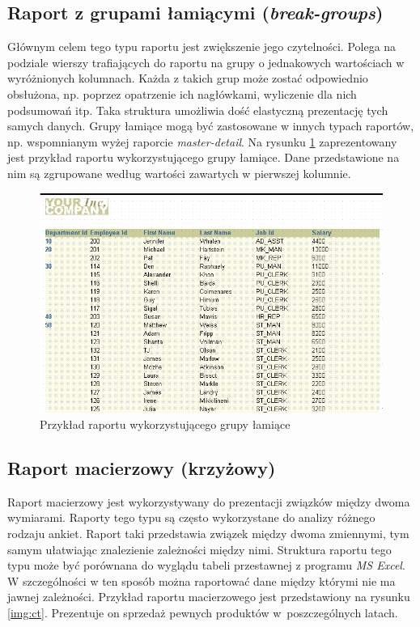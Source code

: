 \documentclass[11pt,a4paper]{article}
\begin{document}
\subsection{Raport z grupami łamiącymi (\emph{break-groups})} \label{teoria:bg}
Głównym celem tego typu raportu jest zwiększenie jego czytelności. Polega na podziale wierszy trafiających do raportu na grupy o jednakowych wartościach w wyróżnionych kolumnach. Każda z takich grup może zostać odpowiednio obsłużona, np. poprzez opatrzenie ich nagłówkami, wyliczenie dla nich podsumowań itp. Taka struktura umożliwia dość elastyczną prezentację tych samych danych. Grupy łamiące mogą być zastosowane w innych typach raportów, np. wspomnianym wyżej raporcie \emph{master-detail}. Na rysunku \ref{img:bg} zaprezentowany jest przykład raportu wykorzystującego grupy łamiące. Dane przedstawione na nim są zgrupowane według wartości zawartych w pierwszej kolumnie.
\begin{figure}[h]
\centering
\includegraphics[scale=0.7]{grp1col_lft1_out1}
\caption{Przykład raportu wykorzystującego grupy łamiące}
\label{img:bg}
\end{figure}

\subsection{Raport macierzowy (krzyżowy) } \label{teoria:ct}
Raport macierzowy jest wykorzystywany do prezentacji związków między dwoma wymiarami. Raporty tego typu są często wykorzystane do analizy różnego rodzaju ankiet. Raport taki przedstawia związek między dwoma zmiennymi, tym samym ułatwiając znalezienie zależności między nimi. Struktura raportu tego typu może być porównana do wyglądu tabeli przestawnej z programu \emph{MS Excel}. W szczególności w ten sposób można raportować dane między którymi nie ma jawnej zależności. Przykład raportu macierzowego jest przedstawiony na rysunku \ref{img:ct}. Prezentuje on sprzedaż pewnych produktów w~poszczególnych latach. 
\end{document}
